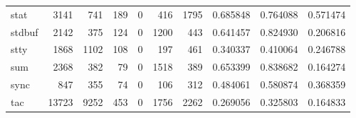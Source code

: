 \begin{longtable}{lrrrrrrrrr}
stat      &                                3141 &                                             741 &                                            189 &                                             0 &                                            416 &                                         1795 &                                           0.685848 &                               0.764088 &                             0.571474 \\
stdbuf    &                                2142 &                                             375 &                                            124 &                                             0 &                                           1200 &                                          443 &                                           0.641457 &                               0.824930 &                             0.206816 \\
stty      &                                1868 &                                            1102 &                                            108 &                                             0 &                                            197 &                                          461 &                                           0.340337 &                               0.410064 &                             0.246788 \\
sum       &                                2368 &                                             382 &                                             79 &                                             0 &                                           1518 &                                          389 &                                           0.653399 &                               0.838682 &                             0.164274 \\
sync      &                                 847 &                                             355 &                                             74 &                                             0 &                                            106 &                                          312 &                                           0.484061 &                               0.580874 &                             0.368359 \\
tac       &                               13723 &                                            9252 &                                            453 &                                             0 &                                           1756 &                                         2262 &                                           0.269056 &                               0.325803 &                             0.164833 \\

\end{longtable}
